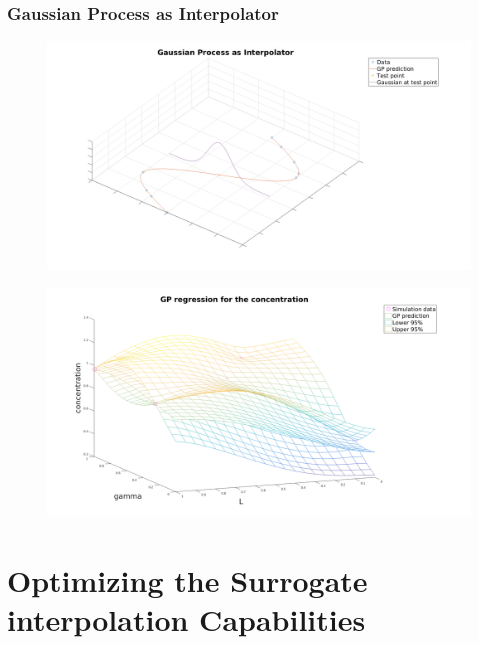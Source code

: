 \documentclass[11pt]{beamer}
\theoremstyle{plain}
\theoremstyle{definition}
\begin{document}
\begin{frame}
\frametitle{Gaussian Process as Interpolator}
\begin{figure}
\includegraphics[scale=0.25]{./codes/Gp_interpolation.png}
\end{figure}

\end{frame}


\begin{frame}
\begin{figure}
\includegraphics[scale=0.2]{./codes/GP_regression.png}
\end{figure}
\end{frame}
\section{Optimizing the Surrogate interpolation Capabilities}
\end{document}
